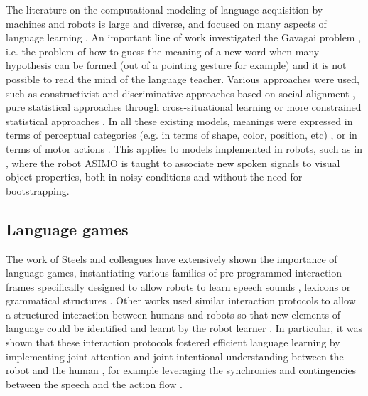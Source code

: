 The literature on the computational modeling of language acquisition by machines and robots is large and diverse, and focused on many aspects of language learning \cite{steels2012grounding,steels2002aibos, cangelosi2010integration, kaplan2008computational, steels2003evolving, brent1997computational, yu2007unified}. An important line of work investigated the Gavagai problem \cite{quine1964word}, i.e. the problem of how to guess the meaning of a new word when many hypothesis can be formed (out of a pointing gesture for example) and it is not possible to read the mind of the language teacher. Various approaches were used, such as constructivist and discriminative approaches based on social alignment \cite{steels06spatialLanguage, steels2008can}, pure statistical approaches through cross-situational learning \cite{xu2007word, smith2008infants} or more constrained statistical approaches \cite{roy2005semiotic, yu2007unified}. In all these existing models, meanings were expressed in terms of perceptual categories (e.g. in terms of shape, color, position, etc) \cite{steels06spatialLanguage, steels2008can,yu2007unified}, or in terms of motor actions \cite{steels2008robot, Massera2010,sugita05a}. This applies to models implemented in robots, such as in \cite{heckmann2009teaching}, where the robot ASIMO is taught to associate new spoken signals to visual object properties, both in noisy conditions and without the need for bootstrapping. 

\subsection{Language games}

The work of Steels and colleagues \cite{steels2012grounding,steels2002aibos} have extensively shown the importance of  language games, instantiating various families of pre-programmed interaction frames specifically designed to allow robots to learn speech sounds \cite{de2000self,oudeyer2006self}, lexicons \cite{steels2002aibos} or grammatical structures \cite{steels06spatialLanguage, steels2008can}. Other works used similar interaction protocols to allow a structured interaction between humans and robots so that new elements of language could be identified and learnt by the robot learner \cite{roy02a,lyon2012interactive,cangelosi06b,yu2004multimodal,cangelosi2010integration,sugita05a,dominey2005learning,cederborg2011imitating}. In particular, it was shown that these interaction protocols fostered efficient language learning by implementing joint attention and joint intentional understanding between the robot and the human \cite{kaplan2006challenges,yu2005role,yu2007unified}, for example leveraging the synchronies and contingencies between the speech and the action flow \cite{rohlfing2006can,schillingmann2011acoustic}.

